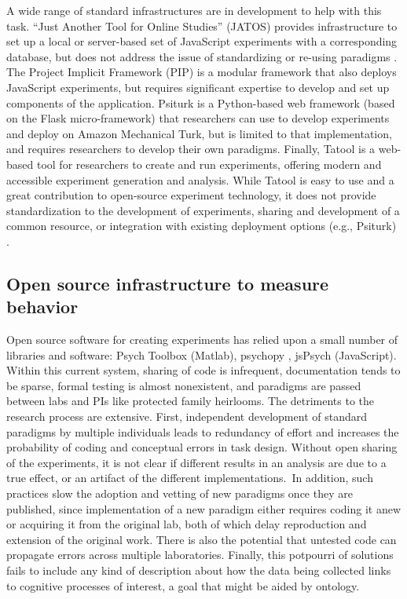 \documentclass{report}
\begin{document}
A wide range of standard infrastructures are in development to help with
this task. ``Just Another Tool for Online Studies'' (JATOS) provides
infrastructure to set up a local or server-based set of JavaScript
experiments with a corresponding database, but does not address the
issue of standardizing or re-using paradigms \cite{Lange2015-dd}.
The Project Implicit Framework (PIP) \cite{noauthor_undated-fd} is
a modular framework that also deploys JavaScript experiments, but
requires significant expertise to develop and set up components of the
application. Psiturk \cite{McDonnell2012-ns} is
a Python-based web framework (based on the Flask micro-framework) that
researchers can use to develop experiments and deploy on Amazon
Mechanical Turk, but is limited to that implementation, and requires
researchers to develop their own paradigms. Finally, Tatool is a
web-based tool for researchers to create and run experiments, offering
modern and accessible experiment generation and analysis. While Tatool
is easy to use and a great contribution to open-source experiment
technology, it does not provide standardization to the development of
experiments, sharing and development of a common resource, or
integration with existing deployment options (e.g., Psiturk) \cite{Makin2016-xi}.

\subsection{Open source infrastructure to measure behavior}

Open source software for creating experiments has relied upon a small
number of libraries and software: Psych Toolbox \cite{Brainard1997-rq} (Matlab),
psychopy \cite{Peirce2007-qr}, jsPsych \cite{De_Leeuw2015-zw} (JavaScript).
Within this current system, sharing of code is infrequent, documentation
tends to be sparse, formal testing is almost nonexistent, and paradigms
are passed between labs and PIs like protected family heirlooms. The
detriments to the research process are extensive. First, independent
development of standard paradigms by multiple individuals leads to
redundancy of effort and increases the probability of coding and
conceptual errors in task design. Without open sharing of the
experiments, it is not clear if different results in an analysis are due
to a true effect, or an artifact of the different implementations.~In
addition, such practices slow the adoption and vetting of new paradigms
once they are published, since implementation of a new paradigm either
requires coding it anew or acquiring it from the original lab, both of
which delay reproduction and extension of the original work. There is
also the potential that untested code can propagate errors across
multiple laboratories. Finally, this potpourri of solutions fails to
include any kind of description about how the data being collected links
to cognitive processes of interest, a goal that might be aided by
ontology.
\end{document}
